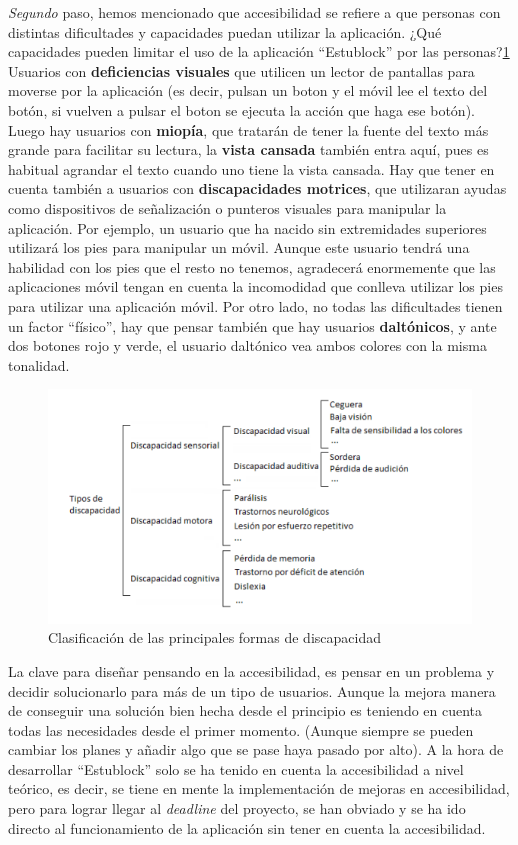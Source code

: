 \emph{Segundo} paso, hemos mencionado que accesibilidad se refiere a que personas con distintas dificultades y capacidades puedan utilizar la aplicación. ¿Qué capacidades pueden limitar el uso de la aplicación ``Estublock'' por las personas?\ref{fig:discapacidad} Usuarios con \textbf{deficiencias visuales} que utilicen un lector de pantallas para moverse por la aplicación (es decir, pulsan un boton y el móvil lee el texto del botón, si vuelven a pulsar el boton se ejecuta la acción que haga ese botón). Luego hay usuarios con \textbf{miopía}, que tratarán de tener la fuente del texto más grande para facilitar su lectura, la \textbf{vista cansada} también entra aquí, pues es habitual agrandar el texto cuando uno tiene la vista cansada. Hay que tener en cuenta también a usuarios con \textbf{discapacidades motrices}, que utilizaran ayudas como dispositivos de señalización o punteros visuales para manipular la aplicación. Por ejemplo, un usuario que ha nacido sin extremidades superiores utilizará los pies para manipular un móvil. Aunque este usuario tendrá una habilidad con los pies que el resto no tenemos, agradecerá enormemente que las aplicaciones móvil tengan en cuenta la incomodidad que conlleva utilizar los pies para utilizar una aplicación móvil. Por otro lado, no todas las dificultades tienen un factor ``físico'', hay que pensar también que hay usuarios \textbf{daltónicos}, y ante dos botones rojo y verde, el usuario daltónico vea ambos colores con la misma tonalidad. \\

\begin{figure}[h!]
  \centering
  \includegraphics[width=0.75\linewidth]{figs/Desarrollo/Accesibilidad/discapacidades}
  \caption[Clasificación de las principales formas de discapacidad]{Clasificación de las principales formas de discapacidad}
  \label{fig:discapacidad}
\end{figure}

La clave para diseñar pensando en la accesibilidad, es pensar en un problema y decidir solucionarlo para más de un tipo de usuarios. Aunque la mejora manera de conseguir una solución bien hecha desde el principio es teniendo en cuenta todas las necesidades desde el primer momento. (Aunque siempre se pueden cambiar los planes y añadir algo que se pase haya pasado por alto). A la hora de desarrollar ``Estublock'' solo se ha tenido en cuenta la accesibilidad a nivel teórico, es decir, se tiene en mente la implementación de mejoras en accesibilidad, pero para lograr llegar al \emph{deadline} del proyecto, se han obviado y se ha ido directo al funcionamiento de la aplicación sin tener en cuenta la accesibilidad. \\

